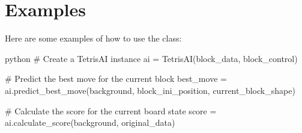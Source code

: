 \documentclass[letterpaper,10pt,english]{sphinxmanual}
\begin{document}
\section{Examples}
\label{\detokenize{index:examples}}
\sphinxAtStartPar
Here are some examples of how to use the  class:

\sphinxAtStartPar
{\color{red}\bfseries{}\textasciigrave{}\textasciigrave{}}{\color{red}\bfseries{}\textasciigrave{}}python
\# Create a TetrisAI instance
ai = TetrisAI(block\_data, block\_control)

\sphinxAtStartPar
\# Predict the best move for the current block
best\_move = ai.predict\_best\_move(background, block\_ini\_position, current\_block\_shape)

\sphinxAtStartPar
\# Calculate the score for the current board state
score = ai.calculate\_score(background, original\_data)



\renewcommand{\indexname}{Index}
\printindex
\end{document}
